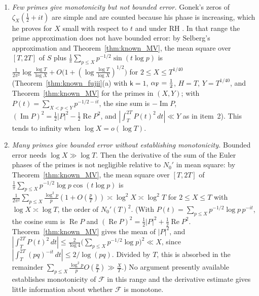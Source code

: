 \documentclass[11pt,a4paper]{article}
\makeatletter
\numberwithin{equation}{section}
\DeclareRobustCommand{\CGref}[1]{\ref{#1}}
\DeclareRobustCommand{\CGcite}[2][]{\if\relax\detokenize{#1}\relax\cite{#2}\else\cite[#1]{#2}\fi}
\let\CG@origref\ref
\newcommand{\CG@gettip}[1]{\@ifundefined{CGTip@#1}{#1}{\csname CGTip@#1\endcsname}}
\newcommand{\CG@getbib}[1]{\@ifundefined{CGBib@#1}{#1}{\csname CGBib@#1\endcsname}}
\DeclareRobustCommand{\CGref}[1]{\pdftooltip{\CG@origref{#1}}{\CG@gettip{#1}}}
\DeclareRobustCommand{\CGcite}[2][]{\pdftooltip{\if\relax\detokenize{#1}\relax\cite{#2}\else\cite[#1]{#2}\fi}{\CG@getbib{#2}}}
\theoremstyle{definition}
\theoremstyle{remark}
\newcommand{\Nz}{N_0} %
\newcommand{\Fc}{\mathcal F}
\makeatother
\begin{document}
\begin{enumerate}
\item \emph{Few primes give monotonicity but not bounded error.} Gonek's zeros of $\zeta_X(\frac12+it)$ are simple and are counted because his phase is increasing, which he proves for $X$ small with respect to $t$ and under RH \CGcite[Thm.~8.1 and \S10]{Gonek2012}. In that range the prime approximation does not have bounded error: by Selberg's approximation \CGcite[\S3]{Fujii1974} and Theorem~\CGref{thm:known_MV}, the mean square over $[T,2T]$ of $S$ plus $\frac1\pi\sum_{p\le X}p^{-1/2}\sin(t\log p)$ is $\frac1{2\pi^2}\log\frac{\log T}{\log X}+O\bigl(1+(\log\frac{\log T}{\log X})^{1/2}\bigr)$ for $2\le X\le T^{1/40}$ (Theorem~\CGref{thm:known_fujii}(a) with $\mathsf k=1$, $\alpha_{\rm F}=\frac12$, $H=T$, $Y=T^{1/40}$, and Theorem~\CGref{thm:known_MV} for the primes in $(X,Y)$; with $P(t)=\sum_{X<p<Y}p^{-1/2-it}$, the sine sum is $-\operatorname{Im}P$, $(\operatorname{Im}P)^2=\frac12|P|^2-\frac12\operatorname{Re}P^2$, and $|\int_T^{2T}P(t)^2\,dt|\ll Y$ as in item~2). This tends to infinity when $\log X=o(\log T)$.
\item \emph{Many primes give bounded error without establishing monotonicity.} Bounded error needs $\log X\gg\log T$. Then the derivative of the sum of the Euler phases of the primes is not negligible relative to $\Nz'$ in mean square: by Theorem~\CGref{thm:known_MV}, the mean square over $[T,2T]$ of $\frac1\pi\sum_{p\le X}p^{-1/2}\log p\cos(t\log p)$ is $\frac{1}{2\pi^2}\sum_{p\le X}\frac{\log^2p}{p}(1+O(\frac{p}{T}))\asymp\log^2X\asymp\log^2T$ for $2\le X\le T$ with $\log X\asymp\log T$, the order of $\Nz'(T)^2$. (With $P(t)=\sum_{p\le X}p^{-1/2}\log p\,p^{-it}$, the cosine sum is $\operatorname{Re}P$ and $(\operatorname{Re}P)^2=\frac12|P|^2+\frac12\operatorname{Re}P^2$. Theorem~\CGref{thm:known_MV} gives the mean of $|P|^2$, and $|\int_T^{2T}P(t)^2\,dt|\le\frac2{\log4}\bigl(\sum_{p\le X}p^{-1/2}\log p\bigr)^2\ll X$, since $|\int_T^{2T}(pq)^{-it}\,dt|\le2/\log(pq)$. Divided by $T$, this is absorbed in the remainder $\sum_{p\le X}\frac{\log^2p}{p}O(\frac pT)\gg\frac XT$.) No argument presently available establishes monotonicity of $\Fc$ in this range and the derivative estimate gives little information about whether $\Fc$ is monotone.
\end{enumerate}
\end{document}
